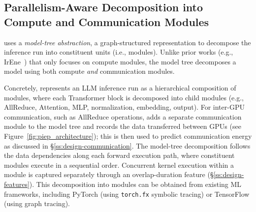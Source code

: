 \subsection{Parallelism-Aware Decomposition into Compute and Communication Modules}
\label{ss:design-decomposition}


\sys{} uses a \emph{model-tree abstraction}, a graph-structured representation to decompose the inference run into constituent units (i.e., modules). Unlike prior works (e.g., IrEne~\cite{irene}) that only focuses on compute modules, the \sys{} model tree decomposes a model using both compute {\em and} communication modules. 

Concretely, \sys{} represents an LLM inference run as a hierarchical composition of modules, where each Transformer block is decomposed into child modules (e.g., AllReduce, Attention, MLP, normalization, embedding, output). 
For inter-GPU communication, such as AllReduce operations, \sys{} adds a separate communication module to the model tree and records the data transferred between GPUs (see Figure~\ref{fig:piep_architecture}); this is then used to predict communication energy as discussed in \S\ref{ss:design-communication}.
The model-tree decomposition follows the data dependencies along each forward execution path, where constituent modules execute in a sequential order.
Concurrent kernel execution within a module is captured separately through an overlap-duration feature (\S\ref{ss:design-features}).
This decomposition into modules can be obtained from existing ML frameworks, including PyTorch (using \texttt{torch.fx} symbolic tracing) or TensorFlow (using graph tracing).


